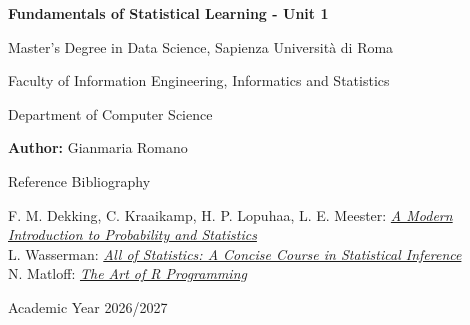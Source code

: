\documentclass{report}
\begin{document}
\begin{titlepage}
    \centering
    \vspace*{2cm}
    
    {\Huge \bfseries Fundamentals of Statistical Learning - Unit 1 \par}
    \vspace{1.5cm}
    
    {\Large Master's Degree in Data Science, Sapienza Università di Roma \par}
    {\large Faculty of Information Engineering, Informatics and Statistics \par}
    \vspace{0.5cm}
    
    {\large Department of Computer Science \par}
    \vspace{3cm}
    
    {\Large \textbf{Author:} Gianmaria Romano \par}
    \vspace{3cm}

    {\Large Reference Bibliography \par}
    {\large F. M. Dekking, C. Kraaikamp, H. P. Lopuhaa, L. E. Meester: \href{https://cis.temple.edu/~latecki/Courses/CIS2033-Spring13/Modern_intro_probability_statistics_Dekking05.pdf}{\textit{A Modern Introduction to Probability and Statistics}} \\
    L. Wasserman: \href{https://egrcc.github.io/docs/math/all-of-statistics.pdf}{\textit{All of Statistics: A Concise Course in Statistical Inference}}} \\
    N. Matloff: \href{https://events.psai.ph/2018/ac/downloads/trainings/T3/book_matloff.pdf}{\textit{The Art of R Programming}} \\
    \vfill
    
    {\large Academic Year 2026/2027 \par}
    \vspace*{1cm}
\end{titlepage}

\clearpage
\end{document}
